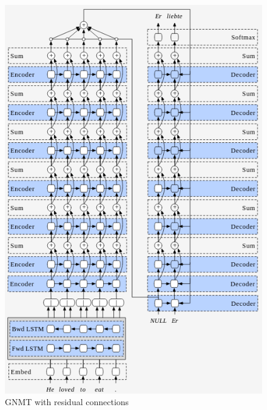 \documentclass[conference]{IEEEtran}
\begin{document}
 \begin{figure}
  \centering
      \includegraphics[width=.9\linewidth]{img/residual_gnmt.png} 
	\caption{GNMT with residual connections}
	\label{fig:gnmtres}
\end{figure}
\end{document}
